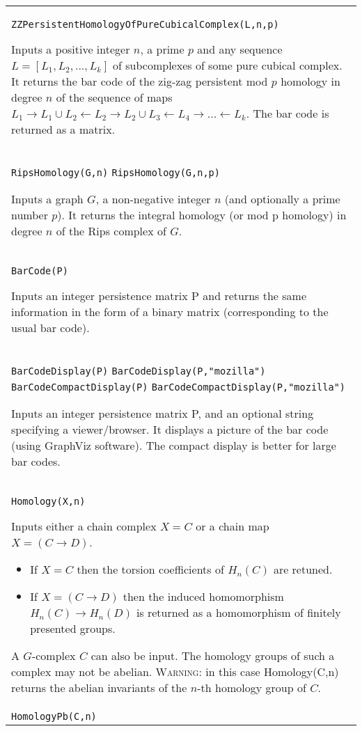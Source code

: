 \documentclass[a4paper,11pt]{report}
\begin{document}
{\begin{center}
\begin{tabular}{|l|}
 \\
 \index{ZZPersistentHomologyOfPureCubicalComplex} \texttt{ZZPersistentHomologyOfPureCubicalComplex(L,n,p)} 

 Inputs a positive integer $n$, a prime $p$ and any sequence $L=[L_1, L_2, ..., L_k]$ of subcomplexes of some pure cubical complex. It returns the bar code of the
zig-zag persistent mod $p$ homology in degree $n$ of the sequence of maps $L_1 \rightarrow L_1 \cup L_2 \leftarrow L_2 \rightarrow L_2 \cup L_3
\leftarrow L_4 \rightarrow ... \leftarrow L_k$. The bar code is returned as a matrix. 

 \\
 \index{RipsHomology} \texttt{RipsHomology(G,n)} \texttt{RipsHomology(G,n,p)} 

 Inputs a graph $G$, a non-negative integer $n$ (and optionally a prime number $p$). It returns the integral homology (or mod p homology) in degree $n$ of the Rips complex of $G$. \\
 \index{BarCode} \texttt{BarCode(P)} 

 Inputs an integer persistence matrix P and returns the same information in the
form of a binary matrix (corresponding to the usual bar code). \\
 \index{BarCodeDisplay} \index{BarCodeCompactDisplay} \texttt{BarCodeDisplay(P)} \texttt{BarCodeDisplay(P,"mozilla")} \texttt{BarCodeCompactDisplay(P)} \texttt{BarCodeCompactDisplay(P,"mozilla")} 

 Inputs an integer persistence matrix P, and an optional string specifying a
viewer/browser. It displays a picture of the bar code (using GraphViz
software). The compact display is better for large bar codes. \\
 \index{Homology} \texttt{Homology(X,n)} 

 Inputs either a chain complex $X=C$ or a chain map $X=(C \longrightarrow D)$. 
\begin{itemize}
\item If $X=C$ then the torsion coefficients of $H_n(C)$ are retuned.
\item  If $X=(C \longrightarrow D)$ then the induced homomorphism $H_n(C) \longrightarrow H_n(D)$ is returned as a homomorphism of finitely presented groups. 
\end{itemize}
 A $G$-complex $C$ can also be input. The homology groups of such a complex may not be abelian. \textsc{Warning:} in this case Homology(C,n) returns the abelian invariants of the $n$-th homology group of $C$. \\
 \index{HomologyPb} \texttt{HomologyPb(C,n)} 


\end{tabular}
\end{center}}
\end{document}
